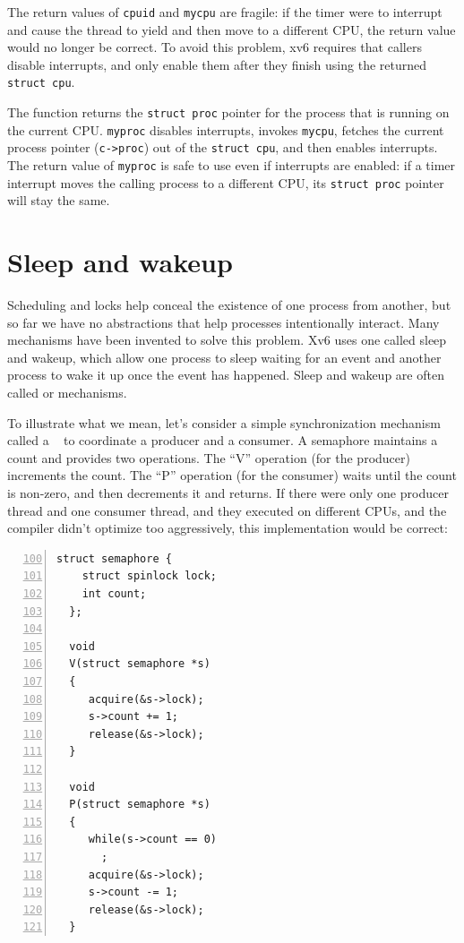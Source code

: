 The return values of
\lstinline{cpuid}
and
\lstinline{mycpu}
are fragile: if the timer were to interrupt and cause
the thread to yield and then move to a different CPU, the
return value would no longer be correct.
To avoid this problem, xv6 requires that callers 
disable interrupts, and only enable
them after they finish using the returned
\lstinline{struct cpu}.

The function
returns the
\lstinline{struct proc}
pointer
for the process that is running on the current CPU.
\lstinline{myproc}
disables interrupts, invokes
\lstinline{mycpu},
fetches the current process pointer
(\lstinline{c->proc})
out of the
\lstinline{struct cpu},
and then enables interrupts.
The return value of
\lstinline{myproc}
is safe to use even if interrupts are enabled:
if a timer interrupt moves the calling process to a
different CPU, its
\lstinline{struct proc}
pointer will stay the same.
\section{Sleep and wakeup}
\label{sec:sleep}

Scheduling and locks help conceal the existence of one process
from another,
but so far we have no abstractions that help
processes intentionally interact.
Many mechanisms have been invented to solve this problem.
Xv6 uses one called sleep and wakeup, which allow one process to
sleep waiting for an event and another process to wake it up
once the event has happened.
Sleep and wakeup are often called 
or 
mechanisms.

To illustrate what we mean, let's consider a
simple synchronization mechanism called a ~\cite{dijkstra65} to
coordinate a producer and a consumer.
A semaphore maintains a count and provides two operations.
The ``V'' operation (for the producer) increments the count.
The ``P'' operation (for the consumer) waits until the count is non-zero,
and then decrements it and returns.
If there were only one producer thread and one consumer thread,
and they executed on different CPUs,
and the compiler didn't optimize too aggressively,
this implementation would be correct:
\begin{lstlisting}[numbers=left,firstnumber=100]
  struct semaphore {
    struct spinlock lock;
    int count;
  };

  void
  V(struct semaphore *s)
  {
     acquire(&s->lock);
     s->count += 1;
     release(&s->lock);
  }

  void
  P(struct semaphore *s)
  {
     while(s->count == 0)
       ;
     acquire(&s->lock);
     s->count -= 1;
     release(&s->lock);
  }
\end{lstlisting}

